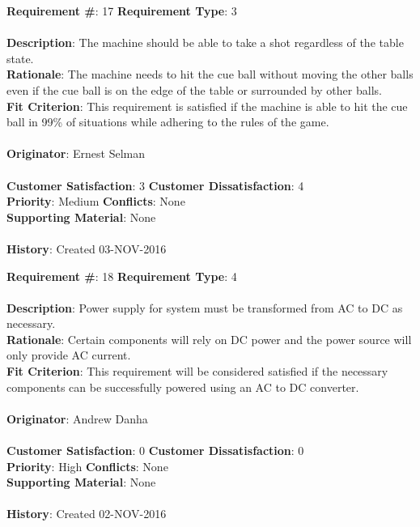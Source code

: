 \documentclass[titlepage]{article}
\begin{document}
\begin{framed}
	\noindent\textbf{Requirement \#}: 17 \hfill \textbf{Requirement Type}: 3 \hfill\\\\
	\noindent\textbf{Description}: The machine should be able to take a shot regardless of the table state.\\
	\textbf{Rationale}: The machine needs to hit the cue ball without moving the other balls even if the cue ball is on the edge of the table or surrounded by other balls. \\
	\textbf{Fit Criterion}: This requirement is satisfied if the machine is able to hit the cue ball in 99\% of situations while adhering to the rules of the game. \\\\
	\textbf{Originator}: Ernest Selman\\\\
	\noindent\textbf{Customer Satisfaction}: 3 \hfill 	\textbf{Customer Dissatisfaction}: 4 \hfill\\
	\textbf{Priority}: Medium \hfill \textbf{Conflicts}: None \hfill\\
	\textbf{Supporting Material}: None\\\\
	\noindent\textbf{History}: Created 03-NOV-2016
\end{framed}

\begin{framed}
	\noindent\textbf{Requirement \#}: 18 \hfill \textbf{Requirement Type}: 4 \hfill\\\\
	\noindent\textbf{Description}: Power supply for system must be transformed from AC to DC as necessary.\\
	\textbf{Rationale}: Certain components will rely on DC power and the power source will only provide AC current.\\
	\textbf{Fit Criterion}: This requirement will be considered satisfied if the necessary components can be successfully powered using an AC to DC converter.\\\\
	\textbf{Originator}: Andrew Danha\\\\ 
	\noindent\textbf{Customer Satisfaction}: 0 \hfill 	\textbf{Customer Dissatisfaction}: 0 \hfill\\
	\textbf{Priority}: High \hfill \textbf{Conflicts}: None \hfill\\
	\textbf{Supporting Material}: None\\\\
	\noindent\textbf{History}: Created 02-NOV-2016
\end{framed}
\end{document}
